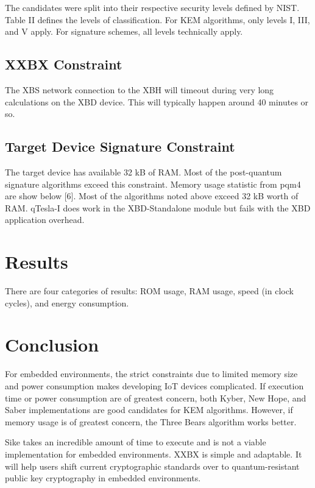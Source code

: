 \documentclass[10pt]{article}
\begin{document}
The candidates were split into their respective security levels defined by NIST. 
Table II defines the levels of classification.
For KEM algorithms, only levels I, III, and V apply. For signature schemes, all levels 
technically apply.

\subsection{XXBX Constraint}
The XBS network connection to the XBH will timeout during very long calculations on 
the XBD device. This will typically happen around 40 minutes or so.

\subsection{Target Device Signature Constraint}
The target device has available 32 kB of RAM. Most of the post-quantum signature 
algorithms exceed this constraint. Memory usage statistic from pqm4 are show below [6].
Most of the algorithms noted above exceed 32 kB worth of RAM. qTesla-I does work in the 
XBD-Standalone module but fails with the XBD application overhead.

\section{Results}

There are four categories of results: ROM usage, RAM usage, speed (in clock cycles), 
and energy consumption.


\section{Conclusion}

For embedded environments, the strict constraints due to limited memory size and power 
consumption makes developing IoT devices complicated. If execution time or power consumption 
are of greatest concern, both Kyber, New Hope, and Saber implementations are good candidates 
for KEM algorithms. However, if memory usage is of greatest concern, the Three Bears algorithm 
works better.

Sike takes an incredible amount of time to execute and is not a viable implementation for 
embedded environments.
XXBX is simple and adaptable. It will help users shift current cryptographic standards over 
to quantum-resistant public key cryptography in embedded environments.




\end{document}
